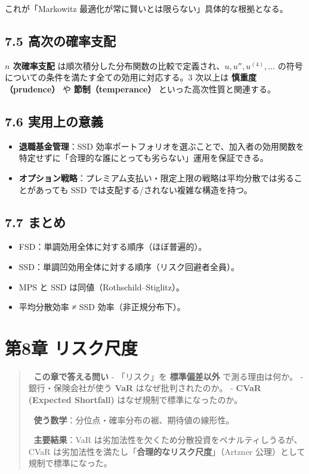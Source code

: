 \documentclass[11pt,a4paper]{report}
\begin{document}
これが「Markowitz 最適化が常に賢いとは限らない」具体的な根拠となる。

\section{7.5 高次の確率支配}

\textbf{$n$ 次確率支配} は順次積分した分布関数の比較で定義され、$u, u'', u^{(4)}, \dots$ の符号についての条件を満たす全ての効用に対応する。3 次以上は \textbf{慎重度（prudence）} や \textbf{節制（temperance）} といった高次性質と関連する。

\section{7.6 実用上の意義}

\begin{itemize}
\item \textbf{退職基金管理}：SSD 効率ポートフォリオを選ぶことで、加入者の効用関数を特定せずに「合理的な誰にとっても劣らない」運用を保証できる。
\item \textbf{オプション戦略}：プレミアム支払い・限定上限の戦略は平均分散では劣ることがあっても SSD では支配する/されない複雑な構造を持つ。
\end{itemize}

\section{7.7 まとめ}

\begin{itemize}
\item FSD：単調効用全体に対する順序（ほぼ普遍的）。
\item SSD：単調凹効用全体に対する順序（リスク回避者全員）。
\item MPS と SSD は同値（Rothschild–Stiglitz）。
\item 平均分散効率 ≠ SSD 効率（非正規分布下）。
\end{itemize}

\noindent\hrulefill

\chapter{第8章 リスク尺度}

\begin{quote}
🎯 \textbf{この章で答える問い}
- 「リスク」を \textbf{標準偏差以外} で測る理由は何か。
- 銀行・保険会社が使う \textbf{VaR} はなぜ批判されたのか。
- \textbf{CVaR (Expected Shortfall)} はなぜ規制で標準になったのか。

📐 \textbf{使う数学}：分位点・確率分布の裾、期待値の線形性。

🔑 \textbf{主要結果}：VaR は劣加法性を欠くため分散投資をペナルティしうるが、CVaR は劣加法性を満たし「\textbf{合理的なリスク尺度}」（Artzner 公理）として規制で標準になった。
\end{quote}
\end{document}
